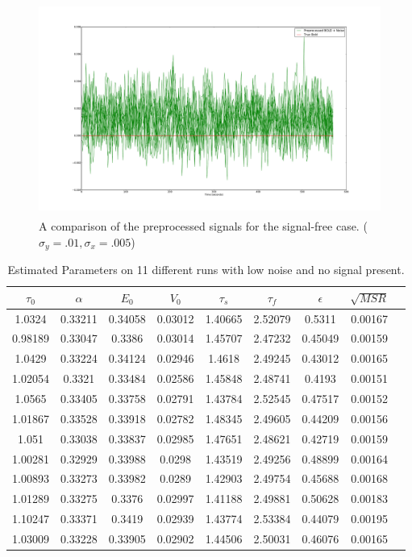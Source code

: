 \begin{figure}[H]
\centering
\includegraphics[clip=true,trim=6cm 3cm 6cm 3cm,height=7cm]{images/preprocessed_noiseonly}
\caption{A comparison of the preprocessed signals for the signal-free case. (
$\sigma_y = .01, \sigma_x = .005$)}
\label{fig:PreprocessedNoiseOnly}
\end{figure}

\begin{table}[t]
\centering
\begin{tabular}{|c | c | c | c | c | c | c | c | c |}
\hline 
$\tau_0$ & $\alpha$ & $E_0$    & $V_0$    & $\tau_s$ & $\tau_f$ & $\epsilon$  &  $\sqrt{MSR}$   \\
\hline 
1.0324 & 0.33211 & 0.34058 & 0.03012 & 1.40665 & 2.52079 & 0.5311 &   0.00167  \\
 0.98189 & 0.33047 & 0.3386 & 0.03014 & 1.45707 & 2.47232 & 0.45049 & 0.00159   \\
 1.0429 & 0.33224 & 0.34124 & 0.02946 & 1.4618 & 2.49245 & 0.43012 &  0.00165   \\
 1.02054 & 0.3321 & 0.33484 & 0.02586 & 1.45848 & 2.48741 & 0.4193 &  0.00151   \\
 1.0565 & 0.33405 & 0.33758 & 0.02791 & 1.43784 & 2.52545 & 0.47517 & 0.00152   \\
 1.01867 & 0.33528 & 0.33918 & 0.02782 & 1.48345 & 2.49605 & 0.44209 &0.00156   \\
 1.051 & 0.33038 & 0.33837 & 0.02985 & 1.47651 & 2.48621 & 0.42719 &  0.00159   \\
 1.00281 & 0.32929 & 0.33988 & 0.0298 & 1.43519 & 2.49256 & 0.48899 & 0.00164   \\
 1.00893 & 0.33273 & 0.33982 & 0.0289 & 1.42903 & 2.49754 & 0.45688 & 0.00168   \\
 1.01289 & 0.33275 & 0.3376 & 0.02997 & 1.41188 & 2.49881 & 0.50628 & 0.00183   \\
 1.10247 & 0.33371 & 0.3419 & 0.02939 & 1.43774 & 2.53384 & 0.44079 & 0.00195   \\
\hline                                                                  
1.03009 & 0.33228 & 0.33905 & 0.02902 & 1.44506 & 2.50031 & 0.46076 & 0.00165 \\
\hline
\end{tabular}
\caption{Estimated Parameters on 11 different runs with low noise and no signal present.}
\label{tab:NoiseOnlyResults} 
\end{table}

